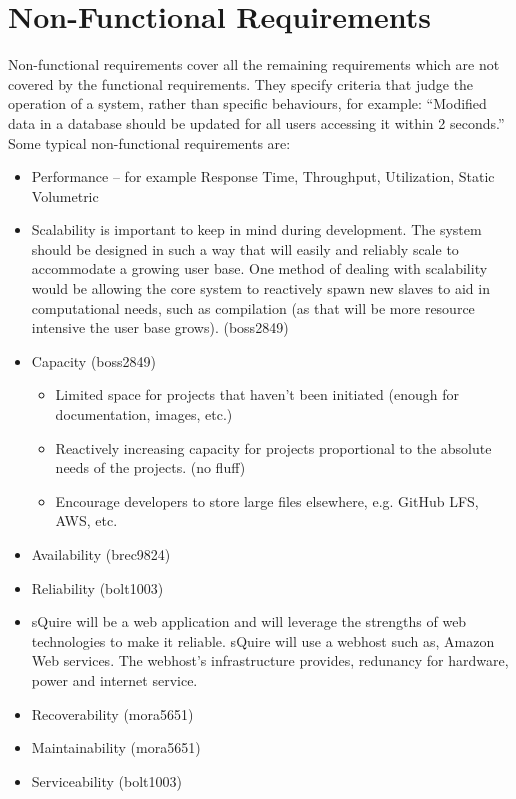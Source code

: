 \documentclass[11pt]{report}
\begin{document}
\section{Non-Functional Requirements}
    Non-functional requirements cover all the remaining requirements which are not covered by the functional requirements. They specify criteria that judge the operation of a system, rather than specific behaviours, for example: ``Modified data in a database should be updated for all users accessing it within 2 seconds.'' Some typical non-functional requirements are:
    \begin{itemize}
        \item Performance – for example Response Time, Throughput, Utilization, Static Volumetric
        \item Scalability is important to keep in mind during development. The system should be designed in such a way that will easily and reliably scale to accommodate a growing user base. One method of dealing with scalability would be allowing the core system to reactively spawn new slaves to aid in computational needs, such as compilation (as that will be more resource intensive the user base grows). (boss2849)
        \item Capacity (boss2849) \begin{itemize}
            \item Limited space for projects that haven't been initiated (enough for documentation, images, etc.)
            \item Reactively increasing capacity for projects proportional to the absolute needs of the projects. (no fluff)
            \item Encourage developers to store large files elsewhere, e.g. GitHub LFS, AWS, etc.
        \end{itemize}
        \item Availability (brec9824)
        \item Reliability (bolt1003)
            \item sQuire will be a web application and will leverage the strengths of web technologies to make it reliable.       sQuire will use a webhost such as, Amazon Web services. The webhost's infrastructure provides,                 redunancy for hardware, power and internet service. 
        \item Recoverability (mora5651)
        \item Maintainability (mora5651)
        \item Serviceability (bolt1003)

\end{itemize}
\end{document}
